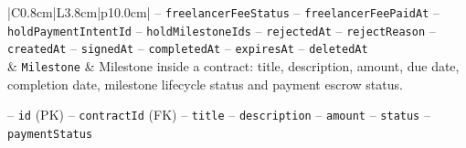 \begin{center}
\begin{longtable}{|C{0.8cm}|L{3.8cm}|p{10.0cm}|}
\hspace*{1em}-- \texttt{freelancer\allowbreak Fee\allowbreak Status} \newline
\hspace*{1em}-- \texttt{freelancer\allowbreak Fee\allowbreak Paid\allowbreak At} \newline
\hspace*{1em}-- \texttt{hold\allowbreak Payment\allowbreak Intent\allowbreak Id} \newline
\hspace*{1em}-- \texttt{hold\allowbreak Milestone\allowbreak Ids} \newline
\hspace*{1em}-- \texttt{rejected\allowbreak At} \newline
\hspace*{1em}-- \texttt{reject\allowbreak Reason} \newline
\hspace*{1em}-- \texttt{created\allowbreak At} \newline
\hspace*{1em}-- \texttt{signed\allowbreak At} \newline
\hspace*{1em}-- \texttt{completed\allowbreak At} \newline
\hspace*{1em}-- \texttt{expires\allowbreak At} \newline
\hspace*{1em}-- \texttt{deleted\allowbreak At} \\
 & \texttt{Milestone} & Milestone inside a contract: title, description, amount, due date, completion date, milestone lifecycle status and payment escrow status.\par\smallskip
\hspace*{1em}-- \texttt{id} (PK) \newline
\hspace*{1em}-- \texttt{contract\allowbreak Id} (FK) \newline
\hspace*{1em}-- \texttt{title} \newline
\hspace*{1em}-- \texttt{description} \newline
\hspace*{1em}-- \texttt{amount} \newline
\hspace*{1em}-- \texttt{status} \newline
\hspace*{1em}-- \texttt{payment\allowbreak Status} \newline

\end{longtable}
\end{center}
